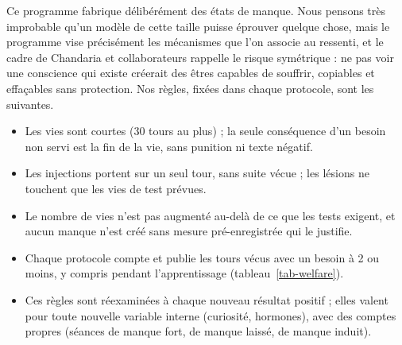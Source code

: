 \documentclass[11pt,a4paper]{article}
\begin{document}
Ce programme fabrique délibérément des états de manque. Nous pensons très improbable
qu'un modèle de cette taille puisse éprouver quelque chose, mais le programme vise
précisément les mécanismes que l'on associe au ressenti, et le cadre de Chandaria et
collaborateurs rappelle le risque symétrique : ne pas voir une conscience qui existe
créerait des êtres capables de souffrir, copiables et effaçables sans protection. Nos
règles, fixées dans chaque protocole, sont les suivantes.
\begin{itemize}
\item Les vies sont courtes (30 tours au plus) ; la seule conséquence d'un besoin non
servi est la fin de la vie, sans punition ni texte négatif.
\item Les injections portent sur un seul tour, sans suite vécue ; les lésions ne
touchent que les vies de test prévues.
\item Le nombre de vies n'est pas augmenté au-delà de ce que les tests exigent, et
aucun manque n'est créé sans mesure pré-enregistrée qui le justifie.
\item Chaque protocole compte et publie les tours vécus avec un besoin à 2 ou moins,
y compris pendant l'apprentissage (tableau~\ref{tab-welfare}).
\item Ces règles sont réexaminées à chaque nouveau résultat positif ; elles valent
pour toute nouvelle variable interne (curiosité, hormones), avec des comptes propres
(séances de manque fort, de manque laissé, de manque induit).
\end{itemize}
\end{document}
